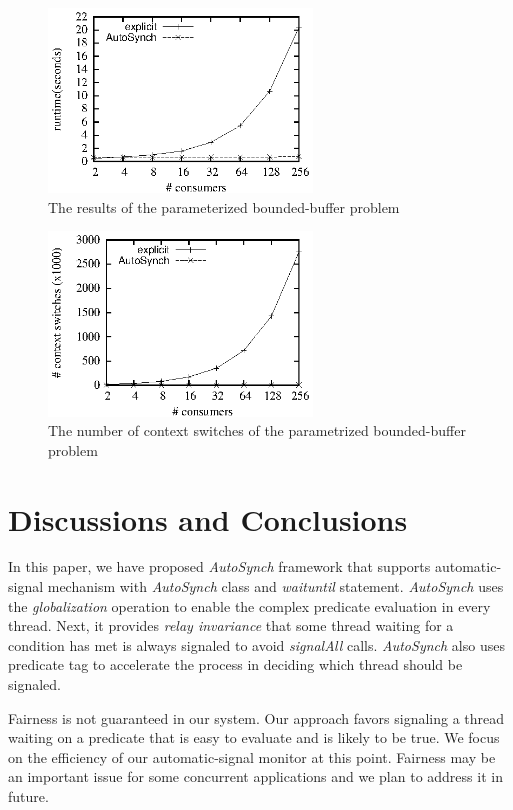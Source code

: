 \documentclass{sigplanconf}
\begin{document}
\begin{figure}[ht!]
  \centering
  \includegraphics[width=70mm]{fig/rpc.eps}
  \caption{The results of the parameterized bounded-buffer problem}
  \label{fig:rpc_eval}
\end{figure}

\begin{figure}[ht!]
  \centering
  \includegraphics[width=70mm]{fig/csrpc.eps}
  \caption{The number of context switches of the parametrized bounded-buffer 
  problem}
\label{fig:csrpc_eval}
\end{figure}



\section{Discussions and Conclusions} \label{sec:conclu}
In this paper, we have proposed {\em AutoSynch} framework that supports 
automatic-signal mechanism with {\em AutoSynch} class and {\em waituntil} statement.
{\em AutoSynch} uses the {\em globalization} operation to enable the complex predicate 
evaluation in every thread. Next, it provides {\em relay invariance} that some
thread waiting for a condition has met is always signaled to avoid {\em signalAll}
calls. {\em AutoSynch} also uses predicate tag to accelerate the process in deciding
which thread should be signaled. 

Fairness is not guaranteed in our system. Our approach favors signaling a 
thread waiting on a predicate that is easy to evaluate and is likely to be 
true. We focus on the efficiency of our automatic-signal monitor at this point.
Fairness may be an important issue for some concurrent applications and we plan
to address it in future.
\end{document}
